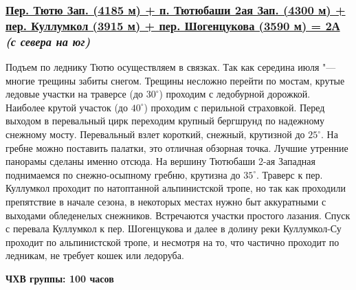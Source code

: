 		\subsubsection*{%
			\hyperref[subsec:Day17]{Пер. Тютю Зап. (4185 м) + п. Тютюбаши 2ая Зап. (4300 м) + пер. Куллумкол (3915 м) + пер. Шогенцукова (3590 м) = 2А}
			{\it (с севера на юг)}%
		}
			Подъем по леднику Тютю осуществляем в связках. Так как середина июля "--- многие трещины забиты снегом.
			Трещины несложно перейти по мостам, крутые ледовые участки на траверсе (до $30^\circ$) проходим с
			ледобурной дорожкой. Наиболее крутой участок (до $40^\circ$) проходим с перильной страховкой. Перед
			выходом в перевальный цирк переходим крупный бергшрунд по надежному снежному мосту. Перевальный взлет
			короткий, снежный, крутизной до $25^\circ$. На гребне можно поставить палатки, это отличная обзорная
			точка. Лучшие утренние панорамы сделаны именно отсюда. На вершину Тютюбаши 2-ая Западная поднимаемся
			по снежно-осыпному гребню, крутизна до $35^\circ$. Траверс к пер. Куллумкол проходит по натоптанной
			альпинистской тропе, но так как проходили препятствие в начале сезона, в некоторых местах нужно быт
			аккуратными с выходами обледенелых снежников. Встречаются участки простого лазания. Спуск с перевала
			Куллумкол к пер. Шогенцукова и далее в долину реки Куллумкол-Су проходит по альпинистской тропе, и
			несмотря на то, что частично проходит по ледникам, не требует кошек или ледоруба.

			{\bf ЧХВ группы: 100 часов}

